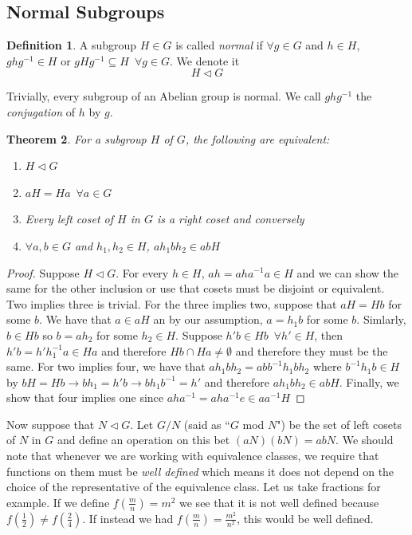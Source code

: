 \documentclass{article}
\newtheorem{theorem}{Theorem}[section]
\theoremstyle{definition}
\newtheorem{definition}[theorem]{Definition}
\begin{document}
\subsection{Normal Subgroups}
\begin{definition}
    A subgroup $H \in G$ is called \emph{normal} if $\forall g \in G$ and $h\in H$, $ghg^{-1}\in H$ or $gHg^{-1} \subseteq H\,\,\, \forall g\in G$. We denote it
    \begin{equation*}
        H\lhd G
    \end{equation*}
\end{definition}
Trivially, every subgroup of an Abelian group is normal. We call $ghg^{-1}$ the \emph{conjugation} of $h$ by $g$. 
\begin{theorem}
    For a subgroup $H$ of $G$, the following are equivalent: 
    \begin{enumerate}
        \item $H \lhd G$ 
        \item $aH = Ha \,\,\, \forall a \in G$
        \item Every left coset of $H$ in $G$ is a right coset and conversely
        \item $\forall a,b\in G$ and $h_1, h_2 \in H$, $ah_1bh_2 \in abH$
    \end{enumerate}
\end{theorem}
\begin{proof}
    Suppose $H \lhd G$. For every $h\in H$, $ah =aha^{-1}a \in H$ and we can show the same for the other inclusion or use that cosets must be disjoint or equivalent. Two implies three is trivial. For the three implies two, suppose that $aH = Hb$ for some $b$. We have that $a\in aH$ an by our assumption, $a = h_1b$ for some $b$. Simlarly, $b\in Hb$ so $b=ah_2$ for some $h_2 \in H$. Suppose $h'b \in Hb \,\,\, \forall h' \in H$, then $h' b = h'h_1^{-1}a \in Ha$ and therefore $Hb \cap Ha \neq \emptyset$ and therefore they must be the same. For two implies four, we have that $ah_1 bh_2 = abb^{-1}h_1bh_2$ where $b^{-1}h_1b \in H$ by $bH = Hb \to bh_1=h'b \to bh_1b^{-1}=h'$ and therefore $ah_1bh_2 \in abH$. Finally, we show that four implies one since $aha^{-1} = aha^{-1}e \in aa^{-1}H$ 
\end{proof}
Now suppose that $N \lhd G$. Let $G/N$ (said as ``$G$ mod $N$") be the set of left cosets of $N$ in $G$ and define an operation on this bet $(aN)(bN)=abN$. We should note that whenever we are working with equivalence classes, we require that functions on them must be \emph{well defined} which means it does not depend on the choice of the representative of the equivalence class. Let us take fractions for example. If we define $f(\frac{m}{n}) =m^2$ we see that it is not well defined because $f(\frac{1}{2}) \neq f(\frac{2}{4})$. If instead we had $f(\frac{m}{n})=\frac{m^2}{n^2}$, this would be well defined.
\end{document}
